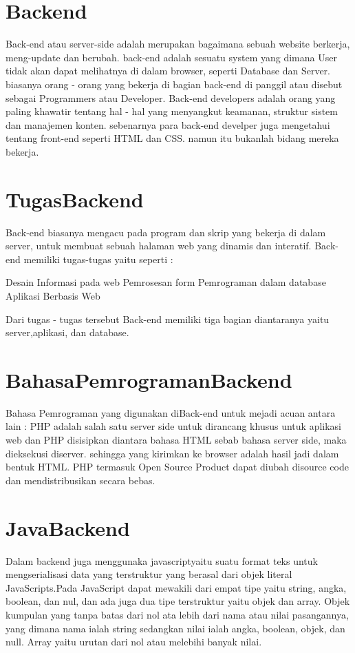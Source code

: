 \section{Backend}
Back-end atau server-side adalah merupakan bagaimana sebuah website berkerja, meng-update
dan berubah. back-end adalah sesuatu system yang dimana User tidak akan dapat melihatnya di dalam browser,
seperti Database dan Server. biasanya orang - orang yang bekerja di bagian back-end di panggil atau disebut sebagai
Programmers atau Developer. Back-end developers adalah orang yang paling khawatir tentang hal - hal yang menyangkut keamanan,
struktur sistem dan manajemen konten. sebenarnya para back-end develper juga mengetahui tentang front-end seperti HTML dan CSS.
namun itu bukanlah bidang mereka bekerja. 

\section{TugasBackend}
Back-end biasanya mengacu pada program dan skrip yang bekerja di dalam server, untuk membuat sebuah halaman web yang dinamis dan interatif. Back-end memiliki tugas-tugas yaitu seperti :

Desain Informasi pada web
Pemrosesan form
Pemrograman dalam database
Aplikasi Berbasis Web

Dari tugas - tugas tersebut Back-end memiliki tiga bagian diantaranya yaitu server,aplikasi, dan database.

\section{BahasaPemrogramanBackend}
Bahasa Pemrograman yang digunakan diBack-end untuk mejadi acuan antara lain :
PHP
 	adalah salah satu server side untuk dirancang khusus untuk aplikasi web dan PHP disisipkan diantara bahasa HTML sebab bahasa server side, maka dieksekusi diserver. sehingga yang kirimkan ke browser adalah hasil jadi dalam bentuk HTML. PHP termasuk Open Source Product dapat diubah disource code dan mendistribusikan secara bebas.

\section{JavaBackend}
Dalam backend juga menggunaka javascriptyaitu suatu format teks untuk mengserialisasi data yang terstruktur yang berasal dari objek literal JavaScripts.Pada JavaScript dapat mewakili dari empat tipe yaitu string, angka, boolean, dan nul, dan ada juga dua tipe terstruktur yaitu objek dan array. Objek kumpulan yang tanpa batas dari nol ata lebih dari nama atau nilai pasangannya, yang dimana nama ialah string sedangkan nilai ialah angka, boolean, objek, dan null. Array yaitu urutan dari nol atau melebihi banyak nilai.

